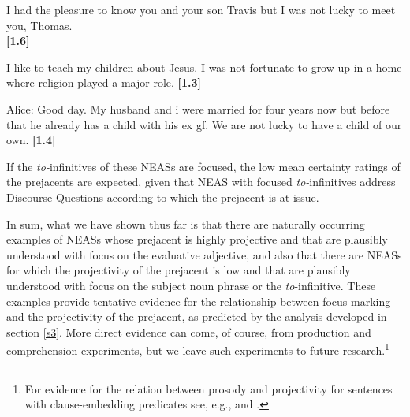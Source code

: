 \documentclass[11pt,fleqn]{article}
\newcommand{\6}{\mbox{$[\hspace*{-.6mm}[$}}
\newcommand{\9}{\mbox{$]\hspace*{-.6mm}]$}}
\begin{document}
\begin{exe}
\ex\label{ex2b}
\begin{xlist}

\ex I had the pleasure to know you and your son Travis  but I was not lucky to meet you, Thomas. \\ \hspace*{.2cm} \hfill {\bf [1.6]}


\ex I like to teach my children about Jesus.  I was not fortunate
to grow up in a home where religion played a major role. \hfill {\bf [1.3]}

\ex Alice: Good day. My husband and i were married for four years now
but before that he already has a child with his ex gf. We are not
lucky to have a child of our own. \hfill {\bf [1.4]}


\end{xlist}

\end{exe}
If the {\em to-}infinitives of these NEASs are focused, the low mean certainty ratings of the prejacents are expected, given that NEAS with focused {\em to-}infinitives address Discourse Questions according to which the prejacent is at-issue.

In sum, what we have shown thus far is that there are naturally occurring examples of NEASs whose prejacent is highly projective and that are plausibly understood with focus on the evaluative adjective, and also that there are NEASs for which the projectivity of the prejacent is low and that are plausibly understood with focus on the subject noun phrase or the {\em to}-infinitive. These examples provide tentative evidence for the relationship between focus marking and the projectivity of the prejacent, as predicted by the analysis developed in section \ref{s3}. More direct evidence can come, of course, from production and comprehension experiments, but we leave such experiments to future research.\footnote{For evidence for the relation between prosody and projectivity for sentences with clause-embedding predicates see, e.g., \citealt{cummins-rohde2015,tonhauser-salt26} and \citealt{djaerv-bacovcin-salt27}.} 
\end{document}
